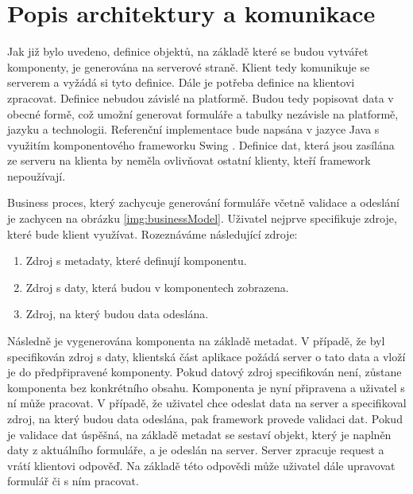 \section{Popis architektury a komunikace}
Jak již bylo uvedeno, definice objektů, na základě které se budou vytvářet komponenty, je generována na serverové straně. Klient tedy komunikuje se serverem a vyžádá si tyto definice. Dále je potřeba definice na klientovi zpracovat. Definice nebudou závislé na platformě. Budou tedy popisovat data v obecné formě, což umožní generovat formuláře a tabulky nezávisle na platformě, jazyku a technologii. Referenční implementace bude napsána v jazyce Java s využitím komponentového frameworku Swing \cite{swing}. Definice dat, která jsou zasílána ze serveru na klienta by neměla ovlivňovat ostatní klienty, kteří framework nepoužívají. 

Business proces, který zachycuje generování formuláře včetně validace a odeslání je zachycen na obrázku \ref{img:businessModel}. Uživatel nejprve specifikuje zdroje, které bude klient využívat. Rozeznáváme následující zdroje:
\begin{enumerate}
\item Zdroj s metadaty, které definují komponentu.
\item Zdroj s daty, která budou v komponentech zobrazena.
\item Zdroj, na který budou data odeslána.
\end{enumerate}
Následně je vygenerována komponenta na základě metadat. V případě, že byl specifikován zdroj s daty, klientská část aplikace požádá server o tato data a vloží je do předpřipravené komponenty. Pokud datový zdroj specifikován není, zůstane komponenta bez konkrétního obsahu. Komponenta je nyní připravena a uživatel s ní může pracovat. V případě, že uživatel chce odeslat data na server a specifikoval zdroj, na který budou data odeslána, pak framework provede validaci dat. Pokud je validace dat úspěšná, na základě metadat se sestaví objekt, který je naplněn daty z aktuálního formuláře, a je odeslán na server. Server zpracuje request a vrátí klientovi odpověď. Na základě této odpovědi může uživatel dále upravovat formulář či s ním pracovat.

